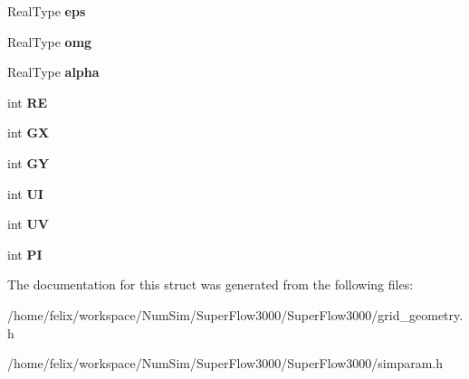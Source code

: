 \begin{DoxyCompactItemize}
\item 
\hypertarget{struct_simparam_a8a477452247ad55e2d9ba2ad71cad937}{Real\-Type {\bfseries eps}}\label{struct_simparam_a8a477452247ad55e2d9ba2ad71cad937}

\item 
\hypertarget{struct_simparam_a4097676bbe9c22c0d591d0a38a92db1f}{Real\-Type {\bfseries omg}}\label{struct_simparam_a4097676bbe9c22c0d591d0a38a92db1f}

\item 
\hypertarget{struct_simparam_a4dd0e3b3cd66c2b3ae18df07f28ea2b5}{Real\-Type {\bfseries alpha}}\label{struct_simparam_a4dd0e3b3cd66c2b3ae18df07f28ea2b5}

\item 
\hypertarget{struct_simparam_accc52cec0d22d7d80d8702127b4b896a}{int {\bfseries R\-E}}\label{struct_simparam_accc52cec0d22d7d80d8702127b4b896a}

\item 
\hypertarget{struct_simparam_a59d3dcbf5156cb45608696f7f1d39393}{int {\bfseries G\-X}}\label{struct_simparam_a59d3dcbf5156cb45608696f7f1d39393}

\item 
\hypertarget{struct_simparam_a8eb58296cc754b83c07616efb2a0ee24}{int {\bfseries G\-Y}}\label{struct_simparam_a8eb58296cc754b83c07616efb2a0ee24}

\item 
\hypertarget{struct_simparam_a0e30f7a3b2f3017fd8432dbe0af711d5}{int {\bfseries U\-I}}\label{struct_simparam_a0e30f7a3b2f3017fd8432dbe0af711d5}

\item 
\hypertarget{struct_simparam_a2d14ee995484c84928cd341ce35079b8}{int {\bfseries U\-V}}\label{struct_simparam_a2d14ee995484c84928cd341ce35079b8}

\item 
\hypertarget{struct_simparam_a1ae75207ff09bb7b8557fdccc2674e54}{int {\bfseries P\-I}}\label{struct_simparam_a1ae75207ff09bb7b8557fdccc2674e54}

\end{DoxyCompactItemize}


The documentation for this struct was generated from the following files\-:\begin{DoxyCompactItemize}
\item 
/home/felix/workspace/\-Num\-Sim/\-Super\-Flow3000/\-Super\-Flow3000/grid\-\_\-geometry.\-h\item 
/home/felix/workspace/\-Num\-Sim/\-Super\-Flow3000/\-Super\-Flow3000/simparam.\-h\end{DoxyCompactItemize}
